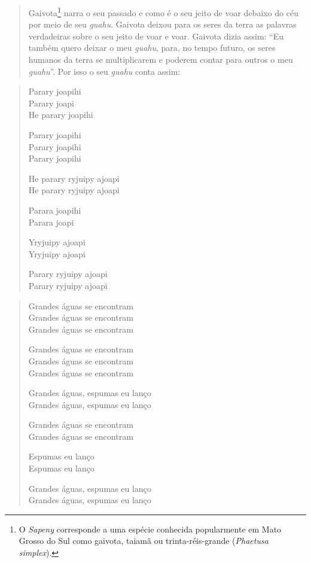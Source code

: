 \begin{quote}
Gaivota\footnote{O \emph{Sapeny} corresponde a uma espécie conhecida
  popularmente em Mato Grosso do Sul como gaivota, taiamã ou
  trinta-réis-grande (\emph{Phaetusa simplex}).} narra o seu passado e
como é o seu jeito de voar debaixo do céu por meio de seu \emph{guahu}.
Gaivota deixou para os seres da terra as palavras verdadeiras sobre o
seu jeito de voar e voar. Gaivota dizia assim: ``Eu também quero deixar
o meu \emph{guahu}, para, no tempo futuro, os seres humanos da terra se
multiplicarem e poderem contar para outros o meu \emph{guahu}''. Por
isso o seu \emph{guahu} conta assim:
\end{quote}

\begin{verse}
Parary joapihi\\
Parary joapi\\
He parary joapihi

Parary joapihi\\
Parary joapihi\\
Parary joapihi

He parary ryjuipy ajoapi\\
He parary ryjuipy ajoapi

Parara joapihi\\
Parara joapi

Yryjuipy ajoapi\\
Yryjuipy ajoapi

Parary ryjuipy ajoapi\\
Parary ryjuipy ajoapi
\end{verse}

\begin{verse}
Grandes águas se encontram\\
Grandes águas se encontram\\
Grandes águas se encontram

Grandes águas se encontram\\
Grandes águas se encontram\\
Grandes águas se encontram

Grandes águas, espumas eu lanço\\
Grandes águas, espumas eu lanço

Grandes águas se encontram\\
Grandes águas se encontram

Espumas eu lanço\\
Espumas eu lanço

Grandes águas, espumas eu lanço\\
Grandes águas, espumas eu lanço
\end{verse}

